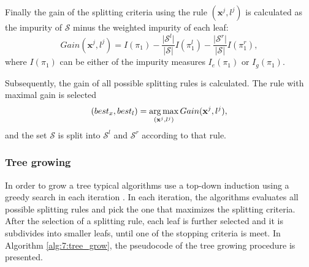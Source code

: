 Finally the gain of the splitting criteria using the rule $(\mathbf{x}^j,l^j)$ is calculated as the 
impurity of $\mathcal{S}$ minus the weighted impurity of each leaf:
\begin{equation}\label{eq:7:gain}
  Gain(\mathbf{x}^j,l^j)=I(\pi_1)-\frac{\vert \mathcal{S}^l \vert}{\vert \mathcal{S} 
\vert}I(\pi^l_1)  -\frac{\vert \mathcal{S}^r \vert}{\vert \mathcal{S} \vert}I(\pi^r_1),
\end{equation} 
where $I(\pi_1)$ can be either of the impurity measures $I_e(\pi_1)$ or $I_g(\pi_1)$.

Subsequently, the gain of all possible splitting rules is calculated. The rule with maximal 
gain is selected
\begin{equation}
  (best_x, best_l) = \operatorname*{arg\,max}_{(\mathbf{x}^j,l^j)}Gain(\mathbf{x}^j,l^j),
\end{equation}
and the set $\mathcal{S}$ is split into $\mathcal{S}^l$ and $\mathcal{S}^r$ according to that rule. 


\subsubsection{Tree growing}
In order to grow a tree typical algorithms use a top-down induction using a greedy search in each
iteration \citep{Rokach2010}. In each iteration, the algorithms evaluates all possible splitting 
rules and pick the one that maximizes the splitting criteria. After the selection of a splitting 
rule, each leaf is further selected and it is subdivides into smaller leafs, until one of the 
stopping criteria is meet. In Algorithm \ref{alg:7:tree_grow}, the pseudocode of the tree 
growing procedure is presented.


